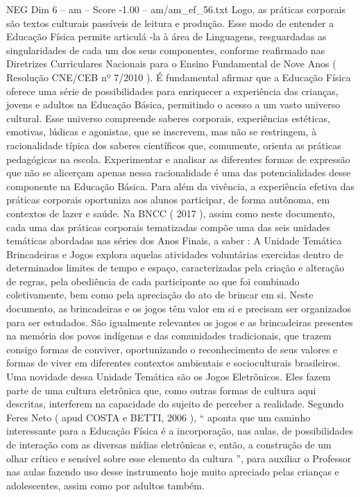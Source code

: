 \begin{textsample}{NEG Dim 6 – am – Score -1.00 – am/am\_ef\_56.txt}
Logo, as práticas corporais são textos culturais passíveis de leitura e produção.
Esse modo de entender a Educação Física permite articulá -la à área de Linguagens, resguardadas as singularidades de cada um dos seus componentes, conforme reafirmado nas Diretrizes Curriculares Nacionais para o Ensino Fundamental de Nove Anos ( Resolução CNE/CEB nº 7/2010 ).
É fundamental afirmar que a Educação Física oferece uma série de possibilidades para enriquecer a experiência das crianças, jovens e adultos na Educação Básica, permitindo o acesso a um vasto universo cultural.
Esse universo compreende saberes corporais, experiências estéticas, emotivas, lúdicas e agonistas, que se inscrevem, mas não se restringem, à racionalidade típica dos saberes científicos que, comumente, orienta as práticas pedagógicas na escola.
Experimentar e analisar as diferentes formas de expressão que não se alicerçam apenas nessa racionalidade é uma das potencialidades desse componente na Educação Básica.
Para além da vivência, a experiência efetiva das práticas corporais oportuniza aos alunos participar, de forma autônoma, em contextos de lazer e saúde.
Na BNCC ( 2017 ), assim como neste documento, cada uma das práticas corporais tematizadas compõe uma das seis unidades temáticas abordadas nas séries dos Anos Finais, a saber : A Unidade Temática Brincadeiras e Jogos explora aquelas atividades voluntárias exercidas dentro de determinados limites de tempo e espaço, caracterizadas pela criação e alteração de regras, pela obediência de cada participante ao que foi combinado coletivamente, bem como pela apreciação do ato de brincar em si.
Neste documento, as brincadeiras e os jogos têm valor em si e precisam ser organizados para ser estudados.
São igualmente relevantes os jogos e as brincadeiras presentes na memória dos povos indígenas e das comunidades tradicionais, que trazem consigo formas de conviver, oportunizando o reconhecimento de seus valores e formas de viver em diferentes contextos ambientais e socioculturais brasileiros.
Uma novidade dessa Unidade Temática são os Jogos Eletrônicos.
Eles fazem parte de uma cultura eletrônica que, como outras formas de cultura aqui descritas, interferem na capacidade do sujeito de perceber a realidade.
Segundo Feres Neto ( apud COSTA e BETTI, 2006 ), “ aponta que um caminho interessante para a Educação Física é a incorporação, nas aulas, de possibilidades de interação com as diversas mídias eletrônicas e, então, a construção de um olhar crítico e sensível sobre esse elemento da cultura ”, para auxiliar o Professor nas aulas fazendo uso desse instrumento hoje muito apreciado pelas crianças e adolescentes, assim como por adultos também.

\end{textsample}
